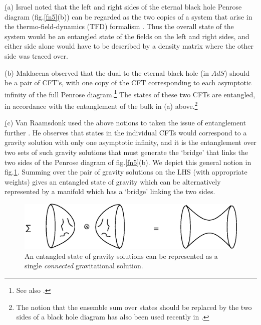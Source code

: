 \documentclass[12pt]{article}
\begin{document}
\b


(a) Israel \cite{israel2} noted that the left and right sides of the eternal black hole Penrose diagram (fig.\ref{fn5}(b)) can be regarded as the two copies of a system that arise in the thermo-field-dynamics (TFD) formalism \cite{umezawa}. Thus the overall state of the system would be an entangled state of the fields on the left and right sides, and either side alone would have to be described by a density matrix where the other side was traced over.

\b

(b) Maldacena \cite{maldacena2} observed that the dual to the eternal black hole (in $AdS$) should be a pair of CFT's, with one copy of the CFT corresponding to each asymptotic infinity of the full Penrose diagram.\footnote{See also \cite{horowitzmarolf,trivedi}.} The states of these two CFTs are entangled, in accordance with the entanglement of the  bulk in (a) above.\footnote{The notion that the ensemble sum over states should be replaced by the two sides of a black hole diagram has also been used recently in \cite{sen}.} 

\b

(c) Van Raamsdonk used the above notions to  taken the issue of entanglement further \cite{raamsdonk}. He observes that states in the individual CFTs would correspond to a gravity solution with only one asymptotic infinity, and it is the entanglement over two sets of such gravity solutions that must generate the `bridge' that links the two sides of the Penrose diagram of fig.\ref{fn5}(b). We depict this general notion in fig.\ref{fn6}. Summing over the pair of gravity solutions on the LHS (with appropriate weights) gives an entangled state of gravity which can be alternatively represented by a manifold which has a `bridge' linking the two sides.

\begin{figure}[htbp]
\begin{center}
\includegraphics[scale=.85]{fn6.eps}
\caption{{An entangled state of gravity solutions can be represented as a single {\it connected} gravitational solution.}}
\label{fn6}
\end{center}
\end{figure}
\end{document}
